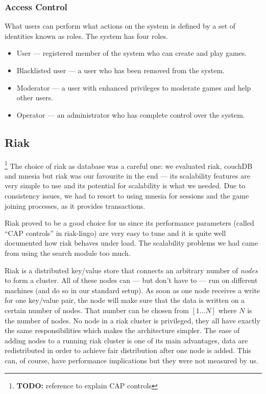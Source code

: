 \documentclass[11pt,a4paper]{report}
\newcommand{\todo}[1]{\footnote{{\color{red} {\bf TODO:} #1}}}
\begin{document}
\subsubsection{Access Control}
What users can perform what actions on the system is defined by a set of
identities known as roles. The system has four roles.

\begin{itemize}
\item User --- registered member of the system who can create and play games.
\item Blacklisted user --- a user who has been removed from the system.
\item Moderator --- a user with enhanced privileges to moderate games and help
other users.
\item Operator --- an administrator who has complete control over the system.

\end{itemize}


\subsection{Riak}
\label{sec:riak}
\todo{reference to explain CAP controls}
The choice of riak as database was a careful one: we evaluated riak, couchDB
and mnesia but riak was our favourite in the end --- its scalability features
are very simple to use and its potential for scalability is what we needed.
Due to consistency issues, we had to resort to using mnesia for sessions and
the game joining processes, as it provides transactions.

Riak proved to be a good choice for us since its performance parameters (called
``CAP controls'' in riak-lingo) are very easy to tune and it is quite well
documented how riak behaves under load. The scalability problems we had
came from using the search module too much.

Riak is a distributed key/value store that connects an arbitrary number of
{\em nodes} to form a cluster. All of these nodes can --- but don't have to ---
run on different machines (and do so in our standard setup). As soon as one
node receives a write for one key/value pair, the node will make sure that the
data is written on a certain number of nodes. That number can be chosen from
$[1 \ldots N]$ where $N$ is the number of nodes.
No node in a riak cluster is privileged, they all have exactly the same
responsibilities which makes the architecture simpler.
The ease of adding nodes to a running riak cluster is one of its main
advantages, data are redistributed in order to achieve fair distribution after
one node is added. This can, of course, have performance implications but they
were not measured by us.
\end{document}
